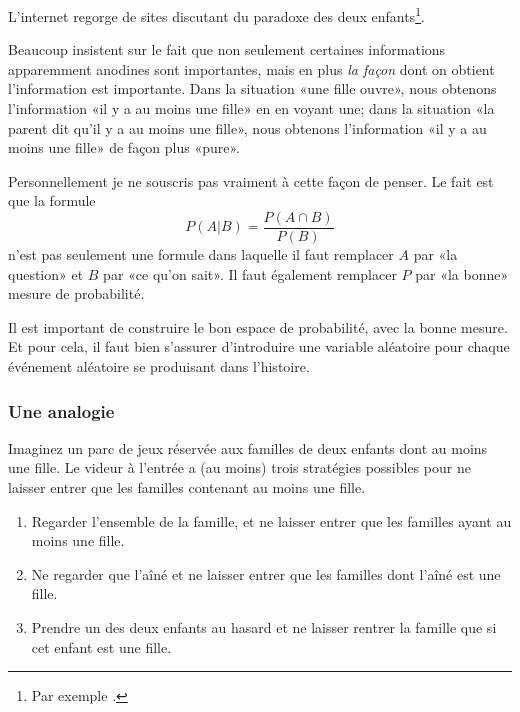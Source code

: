 L'internet regorge de sites discutant du paradoxe des deux enfants\footnote{Par exemple \cite{BIBooBXKDooOTEkjy}.}.

Beaucoup insistent sur le fait que non seulement certaines informations apparemment anodines sont importantes, mais en plus \emph{la façon} dont on obtient l'information est importante. Dans la situation «une fille ouvre», nous obtenons l'information «il y a au moins une fille» en en voyant une; dans la situation «la parent dit qu'il y a au moins une fille», nous obtenons l'information «il y a au moins une fille» de façon plus «pure».

Personnellement je ne souscris pas vraiment à cette façon de penser. Le fait est que la formule
\begin{equation}
	P(A|B)=\frac{ P(A\cap B) }{ P(B) }
\end{equation}
n'est pas seulement une formule dans laquelle il faut remplacer \( A\) par «la question» et \( B\) par «ce qu'on sait». Il faut également remplacer \( P\) par «la bonne» mesure de probabilité.

Il est important de construire le bon espace de probabilité, avec la bonne mesure. Et pour cela, il faut bien s'assurer d'introduire une variable aléatoire pour chaque événement aléatoire se produisant dans l'histoire.

\subsubsection{Une analogie}

Imaginez un parc de jeux réservée aux familles de deux enfants dont au moins une fille. Le videur à l'entrée a (au moins) trois stratégies possibles pour ne laisser entrer que les familles contenant au moins une fille.

\begin{enumerate}
	\item
	      Regarder l'ensemble de la famille, et ne laisser entrer que les familles ayant au moins une fille.
	\item
	      Ne regarder que l'aîné et ne laisser entrer que les familles dont l'aîné est une fille.
	      \item\label{ITEMooRKUAooGtfavc}
	      Prendre un des deux enfants au hasard et ne laisser rentrer la famille que si cet enfant est une fille.
\end{enumerate}

